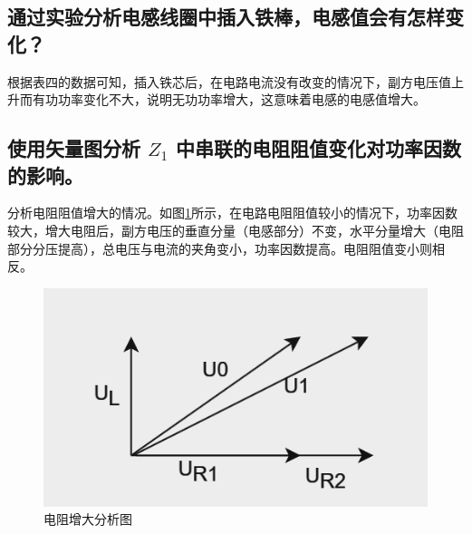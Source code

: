 \documentclass{ctexart}
\begin{document}
\subsection{通过实验分析电感线圈中插入铁棒，电感值会有怎样变化？}
根据表四的数据可知，插入铁芯后，在电路电流没有改变的情况下，副方电压值上升而有功功率变化不大，说明无功功率增大，这意味着电感的电感值增大。
\subsection{使用矢量图分析 $Z_1$ 中串联的电阻阻值变化对功率因数的影响。}
分析电阻阻值增大的情况。如图\ref{fig:电阻分析图}所示，在电路电阻阻值较小的情况下，功率因数较大，增大电阻后，副方电压的垂直分量（电感部分）不变，水平分量增大（电阻部分分压提高），总电压与电流的夹角变小，功率因数提高。电阻阻值变小则相反。
\begin{figure}[!ht]
    \centering
    \includegraphics[scale=1.2]{pic/电阻分析图.png}
    \caption{电阻增大分析图}
    \label{fig:电阻分析图}
\end{figure}
\end{document}

